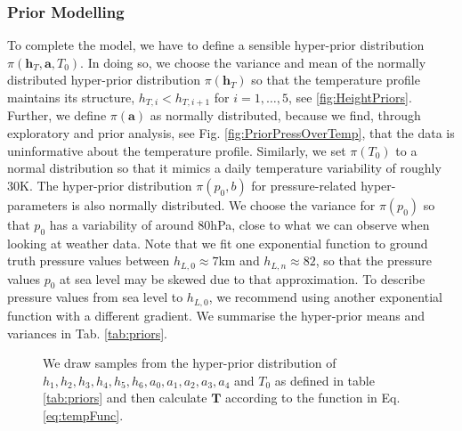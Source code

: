 \subsubsection{Prior Modelling}
To complete the model, we have to define a sensible hyper-prior distribution $\pi(\bm{h}_T, \bm{a}, T_0)$.
In doing so, we choose the variance and mean of the normally distributed hyper-prior distribution $\pi(\bm{h}_T)$ so that the temperature profile maintains its structure, $ h_{T, i} < h_{T, i+1}$ for $i = 1,\dots, 5$, see \ref{fig:HeightPriors}.
Further, we define $\pi(\bm{a})$ as normally distributed, because we find, through exploratory and prior analysis, see Fig. \ref{fig:PriorPressOverTemp}, that the data is uninformative about the temperature profile.
Similarly, we set $\pi(T_0)$ to a normal distribution so that it mimics a daily temperature variability of roughly 30K.
The hyper-prior distribution $\pi(p_0, b)$ for pressure-related hyper-parameters is also normally distributed.
We choose the variance for $\pi(p_0)$ so that $p_0$ has a variability of around 80hPa, close to what we can observe when looking at weather data.
Note that we fit one exponential function to ground truth pressure values between $h_{L,0} \approx 7$km and $h_{L,n} \approx 82$, so that the pressure values $p_0$ at sea level may be skewed due to that approximation.
To describe pressure values from sea level to $h_{L,0}$, we recommend using another exponential function with a different gradient.
We summarise the hyper-prior means and variances in Tab. \ref{tab:priors}.
\begin{figure}[ht!]
	\centering
	
	\caption[Prior Samples of $\bm{T}$ according to the respective hyper-prior distribution.]{We draw samples from the hyper-prior distribution of $h_1, h_2,h_3,h_4,h_5,h_6, a_0, a_1, a_2,a_3,a_4$ and $T_0$ as defined in table \ref{tab:priors} and then calculate $\bm{T}$ according to the function in Eq. \ref{eq:tempFunc}.}
	\label{fig:PriorTemp}
\end{figure}

